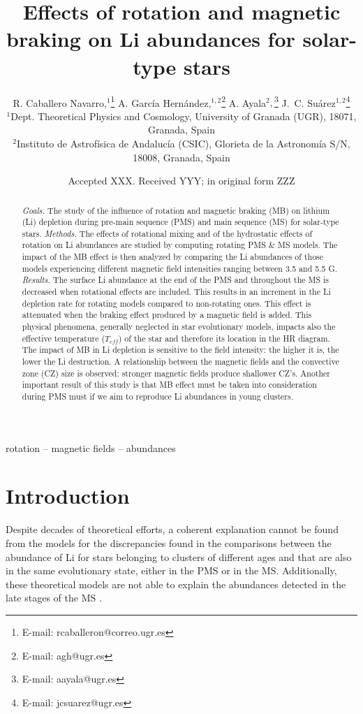 \documentclass[fleqn,usenatbib]{mnras}
\title[Rotation, magnetic braking \& Li abundances]{Effects of rotation and magnetic braking on Li abundances for solar-type stars}
\author[R. Caballero Navarro et al.]{
R. Caballero Navarro,$^{1}$\thanks{E-mail: rcaballeron@correo.ugr.es}
A. Garc\'ia Hern\'andez,$^{1,2}$\thanks{E-mail: agh@ugr.es}
A. Ayala$^{2},$\thanks{E-mail: aayala@ugr.es}
J.~C. Su\'arez$^{1,2}$\thanks{E-mail: jcsuarez@ugr.es}
\\
$^{1}$Dept. Theoretical Physics and Cosmology, University of Granada (UGR), 18071, Granada, Spain\\
$^{2}$Instituto de Astrof\'isica de Andaluc\'ia (CSIC), Glorieta de la Astronom\'ia S/N, 18008, Granada, Spain\\
}
\date{Accepted XXX. Received YYY; in original form ZZZ}
\begin{document}
\label{firstpage}
\pagerange{\pageref{firstpage}--\pageref{lastpage}}
\maketitle

\begin{abstract}
\textit{Goals.} The study of the influence of rotation and magnetic braking (MB) on lithium (Li) depletion during pre-main sequence (PMS) and main sequence (MS) for solar-type stars.
\newline\textit{Methods.} The effects of rotational mixing and of the hydrostatic effects of rotation on Li abundances are studied by computing rotating PMS \& MS models. The impact of the MB effect is then analyzed by comparing the Li abundances of those models experiencing different magnetic field intensities ranging between 3.5 and 5.5 G.
\newline\textit{Results.} The surface Li abundance at the end of the PMS and throughout the MS is decreased when rotational effects are included. This results in an increment in the Li depletion rate for rotating models compared to non-rotating ones. This effect is attenuated when the braking effect produced by a magnetic field is added. This physical phenomena, generally neglected in star evolutionary models, impacts also the effective temperature ($T_{eff}$) of the star and therefore its location in the HR diagram. The impact of MB in Li depletion is sensitive to the field intensity: the higher it is, the lower the Li destruction. A relationship between the magnetic fields and the convective zone (CZ) size is observed: stronger magnetic fields produce shallower CZ's. Another important result of this study is that MB effect must be taken into consideration during PMS must if we aim to reproduce Li abundances in young clusters.
\end{abstract}

\begin{keywords}
rotation -- magnetic fields -- abundances
\end{keywords}



\section{Introduction}
Despite decades of theoretical efforts, a coherent explanation cannot be found from the models for the discrepancies found in the comparisons between the abundance of Li for stars belonging to clusters of different ages and that are also in the same evolutionary state, either in the PMS or in the MS. Additionally, these theoretical models are not able to explain the abundances detected in the late stages of the MS \citep{Tschape2001}.\par
\end{document}
